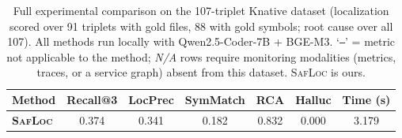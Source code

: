 \begin{table}[t]
  \centering
  \caption{Full experimental comparison on the 107-triplet Knative dataset (localization scored over 91 triplets with gold files, 88 with gold symbols; root cause over all 107). All methods run locally with Qwen2.5-Coder-7B + BGE-M3. `\texttt{--}' = metric not applicable to the method; \emph{N/A} rows require monitoring modalities (metrics, traces, or a service graph) absent from this dataset. \textsc{SafLoc} is ours.}
  \label{tab:fullresults}
  \setlength{\tabcolsep}{5pt}
  \begin{tabular}{lcccccc}
    \toprule
    Method & Recall@3 & LocPrec & SymMatch & RCA & Halluc & Time (s) \\
    \midrule
    \midrule
    \textbf{\textsc{SafLoc}} & 0.374 & 0.341 & 0.182 & 0.832 & 0.000 & 3.179 \\
    \bottomrule
  \end{tabular}
\end{table}
